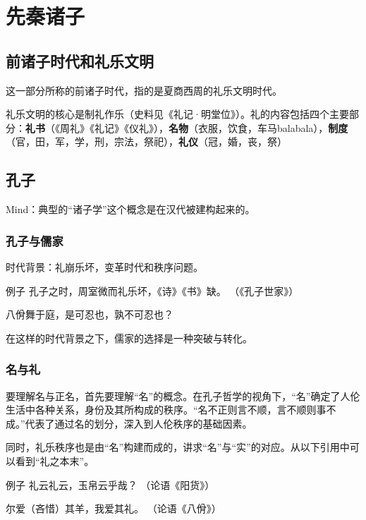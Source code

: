 \section{先秦诸子}

\subsection{前诸子时代和礼乐文明}
这一部分所称的前诸子时代，指的是夏商西周的礼乐文明时代。

礼乐文明的核心是制礼作乐（史料见《礼记·明堂位》）。礼的内容包括四个主要部分：\textbf{礼书}（《周礼》《礼记》《仪礼》），\textbf{名物}（衣服，饮食，车马balabala），\textbf{制度}（官，田，军，学，刑，宗法，祭祀），\textbf{礼仪}（冠，婚，丧，祭）

\subsection{孔子}

Mind：典型的“诸子学”这个概念是在汉代被建构起来的。

\subsubsection{孔子与儒家}

时代背景：礼崩乐坏，变革时代和秩序问题。

\begin{fancybox}{例子}
    孔子之时，周室微而礼乐坏，《诗》《书》缺。 （《孔子世家》）
    
    八佾舞于庭，是可忍也，孰不可忍也？
\end{fancybox}

在这样的时代背景之下，儒家的选择是一种突破与转化。

\subsubsection{名与礼}

要理解名与正名，首先要理解“名”的概念。在孔子哲学的视角下，“名”确定了人伦生活中各种关系，身份及其所构成的秩序。“名不正则言不顺，言不顺则事不成。”代表了通过名的划分，深入到人伦秩序的基础因素。

同时，礼乐秩序也是由“名”构建而成的，讲求“名”与“实”的对应。从以下引用中可以看到“礼之本末”。

\begin{fancybox}{例子}
    礼云礼云，玉帛云乎哉？  （论语《阳货》）

    尔爱（吝惜）其羊，我爱其礼。  （论语《八佾》）
\end{fancybox}

